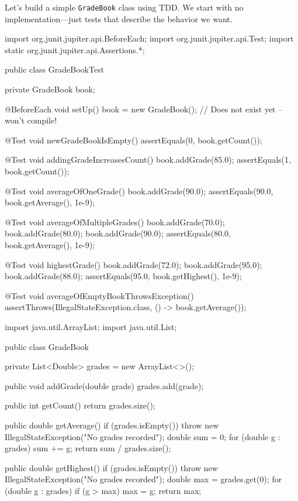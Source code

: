 \documentclass[11pt,letterpaper]{article}
\begin{document}
Let's build a simple \texttt{GradeBook} class using TDD. We start with no implementation---just tests that describe the behavior we want.

\begin{javacode}
import org.junit.jupiter.api.BeforeEach;
import org.junit.jupiter.api.Test;
import static org.junit.jupiter.api.Assertions.*;

public class GradeBookTest {
    private GradeBook book;

    @BeforeEach
    void setUp() {
        book = new GradeBook();  // Does not exist yet -- won't compile!
    }

    @Test
    void newGradeBookIsEmpty() {
        assertEquals(0, book.getCount());
    }

    @Test
    void addingGradeIncreasesCount() {
        book.addGrade(85.0);
        assertEquals(1, book.getCount());
    }

    @Test
    void averageOfOneGrade() {
        book.addGrade(90.0);
        assertEquals(90.0, book.getAverage(), 1e-9);
    }

    @Test
    void averageOfMultipleGrades() {
        book.addGrade(70.0);
        book.addGrade(80.0);
        book.addGrade(90.0);
        assertEquals(80.0, book.getAverage(), 1e-9);
    }

    @Test
    void highestGrade() {
        book.addGrade(72.0);
        book.addGrade(95.0);
        book.addGrade(88.0);
        assertEquals(95.0, book.getHighest(), 1e-9);
    }

    @Test
    void averageOfEmptyBookThrowsException() {
        assertThrows(IllegalStateException.class, () -> book.getAverage());
    }
}
\end{javacode}

\begin{javacode}
import java.util.ArrayList;
import java.util.List;

public class GradeBook {
    private List<Double> grades = new ArrayList<>();

    public void addGrade(double grade) {
        grades.add(grade);
    }

    public int getCount() {
        return grades.size();
    }

    public double getAverage() {
        if (grades.isEmpty()) {
            throw new IllegalStateException("No grades recorded");
        }
        double sum = 0;
        for (double g : grades) sum += g;
        return sum / grades.size();
    }

    public double getHighest() {
        if (grades.isEmpty()) {
            throw new IllegalStateException("No grades recorded");
        }
        double max = grades.get(0);
        for (double g : grades) {
            if (g > max) max = g;
        }
        return max;
    }
}
\end{javacode}
\end{document}
